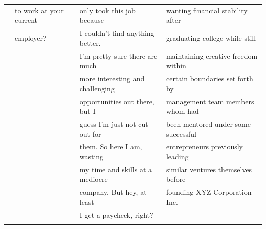 \documentclass[11pt]{article}
\begin{document}
\begin{table}[htbp]
{\begin{tabular}{llll}
&to work at your current & only took this job because & wanting financial stability after\\
&employer?& I couldn't find anything better. &  graduating college while still \\
&&I'm pretty sure there are much& maintaining creative freedom within\\
&&more interesting and challenging &certain boundaries set forth by \\
&&opportunities out there, but I &management team members whom had\\
&&guess I'm just not cut out for&been mentored under some successful\\
&&them. So here I am, wasting &entrepreneurs previously leading\\
&&my time and skills at a mediocre &similar ventures themselves before \\
&&company. But hey, at least&founding XYZ Corporation Inc.\\
&&I get a paycheck, right?&\\\\


\bottomrule

\end{tabular}
}
\end{table}
\end{document}
